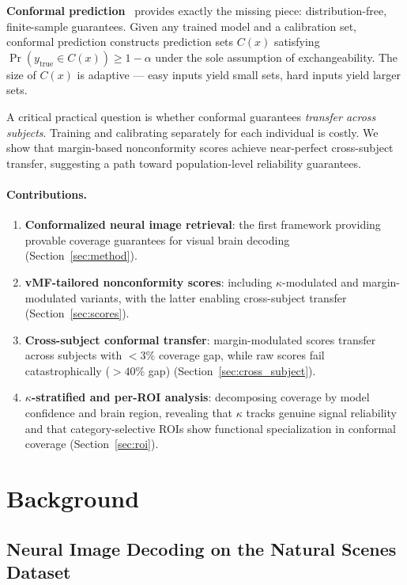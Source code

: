 \documentclass{article}
\begin{document}
\textbf{Conformal prediction}~\citep{vovk2005algorithmic, angelopoulos2023conformal} provides exactly the missing piece: distribution-free, finite-sample guarantees. Given any trained model and a calibration set, conformal prediction constructs prediction sets $C(x)$ satisfying $\Pr(y_{\text{true}} \in C(x)) \geq 1 - \alpha$ under the sole assumption of exchangeability. The size of $C(x)$ is adaptive --- easy inputs yield small sets, hard inputs yield larger sets.

A critical practical question is whether conformal guarantees \emph{transfer across subjects}. Training and calibrating separately for each individual is costly. We show that margin-based nonconformity scores achieve near-perfect cross-subject transfer, suggesting a path toward population-level reliability guarantees.

\paragraph{Contributions.}
\begin{enumerate}
    \item \textbf{Conformalized neural image retrieval}: the first framework providing provable coverage guarantees for visual brain decoding (Section~\ref{sec:method}).
    \item \textbf{vMF-tailored nonconformity scores}: including $\kappa$-modulated and margin-modulated variants, with the latter enabling cross-subject transfer (Section~\ref{sec:scores}).
    \item \textbf{Cross-subject conformal transfer}: margin-modulated scores transfer across subjects with $<3\%$ coverage gap, while raw scores fail catastrophically ($>40\%$ gap) (Section~\ref{sec:cross_subject}).
    \item \textbf{$\kappa$-stratified and per-ROI analysis}: decomposing coverage by model confidence and brain region, revealing that $\kappa$ tracks genuine signal reliability and that category-selective ROIs show functional specialization in conformal coverage (Section~\ref{sec:roi}).
\end{enumerate}

\section{Background}
\label{sec:background}

\subsection{Neural Image Decoding on the Natural Scenes Dataset}
\end{document}
